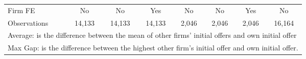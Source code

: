 {\begin{tabular}{l*{7}{c}}
Firm FE             &          No         &          No         &         Yes         &          No         &          No         &         Yes         &          No         \\
Observations        &      14,133         &      14,133         &      14,133         &       2,046         &       2,046         &       2,046         &      16,164         \\
\hline\hline
\multicolumn{8}{l}{\footnotesize Average: is the difference between the mean of other firms' initial offers and own initial offer}\\
\multicolumn{8}{l}{\footnotesize Max Gap: is the difference between the highest other firm's initial offer and own initial offer.}\\
\end{tabular}
}
